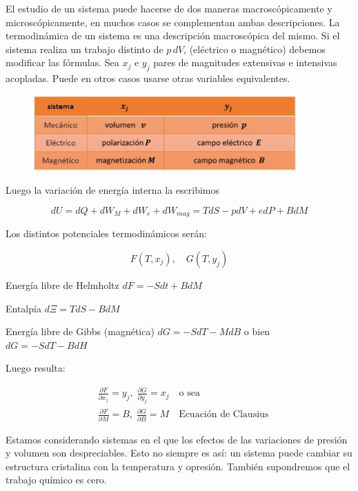 El estudio de un sistema puede hacerse de dos maneras macroscópicamente y microscópicamente, en muchos casos se complementan ambas descripciones. La termodinámica de un sistema es una descripción macroscópica del mismo. Si el sistema realiza un trabajo distinto de $p\,dV$, (eléctrico o magnético) debemos modificar las fórmulas. Sea $x_{j}$ e $y_{j}$ pares de magnitudes extensivas e intensivas acopladas. Puede en otros casos usarse otras variables equivalentes.

\begin{figure}[H]
    \centering
    \includegraphics[width=0.9\textwidth]{./Figures/fig424}
	\label{fig:424}
\end{figure}

Luego la variación de energía interna la escribimos

\begin{equation}
dU=dQ+dW_{M}+dW_{e}+dW_{mag} = TdS-pdV+edP+BdM
\end{equation}

Los distintos potenciales termodinámicos serán:

\begin{equation}
F(T,x_{j}) , \quad G(T, y_{j})
\end{equation}

Energía libre de Helmholtz $dF=-Sdt+BdM$

Entalpía $d\Xi =  TdS - BdM$

Energía libre de Gibbs (magnética) $dG=-SdT-MdB$ o bien $dG=-SdT-BdH$

Luego resulta:

\begin{equation}
\begin{aligned}
  & \frac{\partial F}{\partial x_{j}} =y_{j}, \; \frac{\partial G}{\partial y_{j}} =x_{j} \quad \text{o sea}\\ 
  & \frac{\partial F}{\partial M} =B, \; \frac{\partial G}{\partial B} =M \quad  \text{Ecuación de Clausius}
\end{aligned}
\end{equation}

Estamos considerando sistemas en el que los efectos de las variaciones de presión y volumen son despreciables. Esto no siempre es así: un sistema puede cambiar su estructura cristalina con la temperatura y opresión. También supondremos que el trabajo químico es cero.

